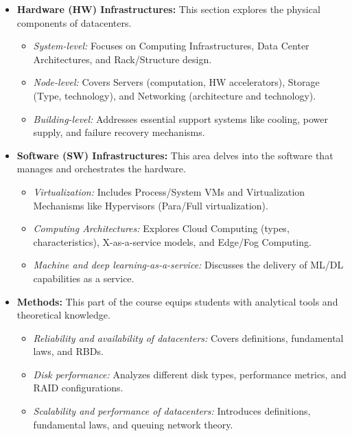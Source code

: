 \begin{itemize}
    \item \textbf{Hardware (HW) Infrastructures:} This section explores the physical components of datacenters.
    \begin{itemize}
        \item \textit{System-level:} Focuses on Computing Infrastructures, Data Center Architectures, and Rack/Structure design.
        \item \textit{Node-level:} Covers Servers (computation, HW accelerators), Storage (Type, technology), and Networking (architecture and technology).
        \item \textit{Building-level:} Addresses essential support systems like cooling, power supply, and failure recovery mechanisms.
    \end{itemize}
    
    \item \textbf{Software (SW) Infrastructures:} This area delves into the software that manages and orchestrates the hardware.
    \begin{itemize}
        \item \textit{Virtualization:} Includes Process/System VMs and Virtualization Mechanisms like Hypervisors (Para/Full virtualization).
        \item \textit{Computing Architectures:} Explores Cloud Computing (types, characteristics), X-as-a-service models, and Edge/Fog Computing.
        \item \textit{Machine and deep learning-as-a-service:} Discusses the delivery of ML/DL capabilities as a service.
    \end{itemize}
    
    \item \textbf{Methods:} This part of the course equips students with analytical tools and theoretical knowledge.
    \begin{itemize}
        \item \textit{Reliability and availability of datacenters:} Covers definitions, fundamental laws, and RBDs.
        \item \textit{Disk performance:} Analyzes different disk types, performance metrics, and RAID configurations.
        \item \textit{Scalability and performance of datacenters:} Introduces definitions, fundamental laws, and queuing network theory.
    \end{itemize}
\end{itemize}

